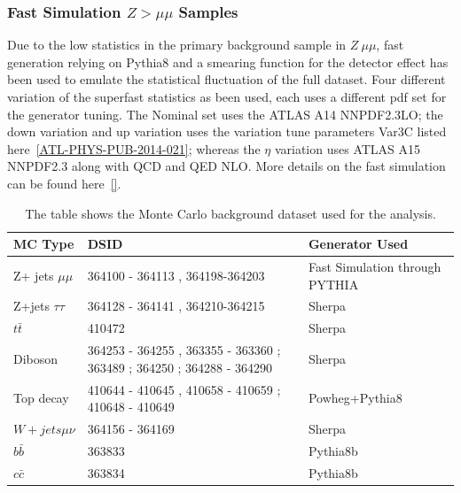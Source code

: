 \subsubsection{Fast Simulation $Z > \mu\mu$  Samples}
\label{sec:fastsimulation}
Due to the low statistics in the primary background sample in  $Z \> \mu \mu$, fast generation relying on Pythia8 and a smearing function for the detector effect has been used to emulate the statistical fluctuation of the full dataset. Four different variation of the superfast statistics as been used, each uses a different pdf set for the generator tuning. The Nominal set uses the ATLAS A14 NNPDF2.3LO; the down variation and up variation uses the variation tune parameters Var3C listed here~\ref{ATL-PHYS-PUB-2014-021}; whereas the $\eta$ variation uses ATLAS A15 NNPDF2.3 along with QCD and QED NLO. More details on the fast simulation can be found here~\ref{}.

\begin{table}[!htb]
    \begin{center}
    \caption{
        The table shows the Monte Carlo background dataset used for the analysis. 
    \label{table:MC}
    }
\label{tab:MC samples}
\begin{tabular}{|l|l|l|}
\hline
\textbf{MC Type}   & \textbf{DSID}                                                         &\textbf{Generator Used}\\ \hline
Z+ jets $\mu\mu$   & 364100 - 364113 , 364198-364203                                       &Fast Simulation through PYTHIA\\ \hline
Z+jets $\tau \tau$ & 364128 - 364141 , 364210-364215                                       &Sherpa\\ \hline
$t\bar{t}$         & 410472                                                                &Sherpa\\ \hline
Diboson            & 364253 - 364255 , 363355 - 363360 ; 363489 ; 364250 ; 364288 - 364290 &Sherpa\\ \hline
Top decay          & 410644 - 410645 , 410658 - 410659 ; 410648 - 410649                   &Powheg+Pythia8\\ \hline
$W + jets \mu\nu$  & 364156 - 364169                                                       &Sherpa\\ \hline
$b\bar{b}$         & 363833                                                                &Pythia8b\\ \hline
$c\bar{c}$         & 363834                                                                &Pythia8b\\ \hline

\end{tabular}
\end{center}
\end{table}


